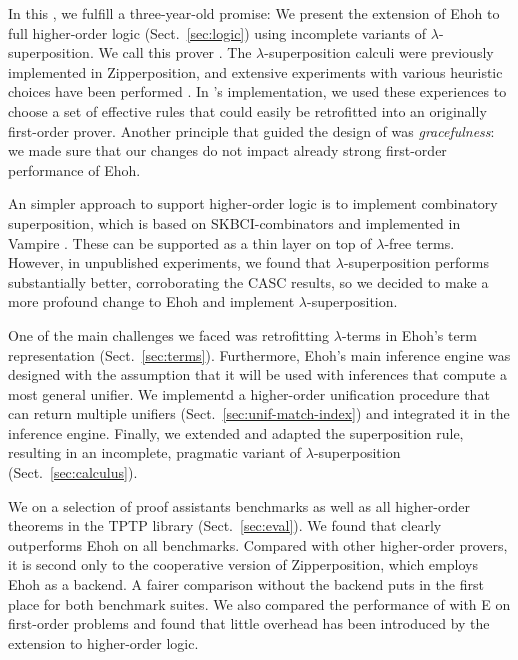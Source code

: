 In this \paper, we fulfill a three-year-old promise: We present the extension of
Ehoh to full higher-order logic (Sect.~\ref{sec:logic}) using incomplete variants
of $\lambda$-superposition. We call this prover \ehohii.
%
The $\lambda$-superposition calculi were
previously implemented in Zipperposition, and
extensive experiments with various heuristic choices have been performed
\cite{section-making-ho-work}. In \ehohii{}'s implementation, we used
these experiences to choose a set of effective rules that could easily be
retrofitted into an originally first-order prover. Another principle that guided 
the design of \ehohii{} was \emph{gracefulness}: we made sure that our changes
do not impact already strong first-order performance of Ehoh. 

An simpler approach to support higher-order logic is to implement
combinatory superposition, which is based on \textsf{SKBCI}-combinators
and implemented in Vampire \cite{br-20-full-sup-w-combs}.
These can be supported as a thin layer on top of $\lambda$-free terms. However,
in unpublished experiments, we found that $\lambda$-superposition performs
substantially better, corroborating the CASC results, so we
decided to make a more profound change to Ehoh and implement
$\lambda$-superposition.


One of the main challenges we faced was retrofitting $\lambda$-terms in Ehoh's
term representation (Sect.~\ref{sec:terms}). Furthermore, Ehoh's main inference
engine was designed with the assumption that it will be used with
inferences that compute a most general unifier. We
implementd a higher-order unification procedure \cite{unif-section}
that can return multiple unifiers (Sect.~\ref{sec:unif-match-index}) and
integrated it in the inference engine. Finally, we extended and adapted the
superposition rule, resulting in an incomplete, pragmatic variant of
$\lambda$-superposition (Sect.~\ref{sec:calculus}).

We  \ehohii{} on a selection of proof assistants benchmarks
as well as all higher-order theorems in the TPTP library \cite{gs-17-tptp}
(Sect.~\ref{sec:eval}). We found
that \ehohii{} clearly outperforms Ehoh on all benchmarks. Compared
with other higher-order provers, it is second
only to the cooperative version of Zipperposition, which employs Ehoh as a
backend. A fairer comparison without the backend puts \ehohii{} in the
first place for both benchmark suites.
We also compared the performance of \ehohii{} with E on first-order
problems and found that little overhead has been introduced by the
extension to higher-order logic.

